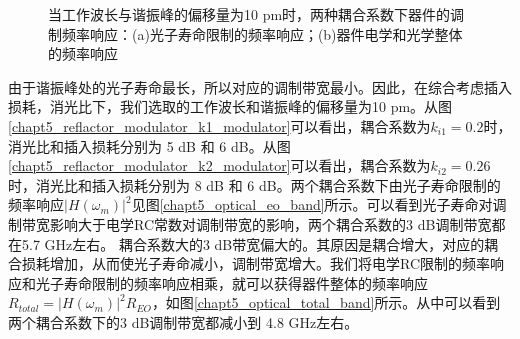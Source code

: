 \begin{figure}[htb]
	\small
	\caption{当工作波长与谐振峰的偏移量为10 pm时，两种耦合系数下器件的调制频率响应：(a)光子寿命限制的频率响应；(b)器件电学和光学整体的频率响应}
	\label{chapt5_optical_oe_total_band}	
\end{figure}
				
由于谐振峰处的光子寿命最长，所以对应的调制带宽最小。因此，在综合考虑插入损耗，消光比下，我们选取的工作波长和谐振峰的偏移量为10 pm。从图\ref{chapt5_reflactor_modulator_k1_modulator}可以看出，耦合系数为$k_{i1} = 0.2$时，消光比和插入损耗分别为 5 dB 和 6 dB。从图\ref{chapt5_reflactor_modulator_k2_modulator}可以看出，耦合系数为$k_{i2} = 0.26$时，消光比和插入损耗分别为 8 dB 和 6 dB。两个耦合系数下由光子寿命限制的频率响应$|H(\omega_m)|^2$见图\ref{chapt5_optical_eo_band}所示。可以看到光子寿命对调制带宽影响大于电学RC常数对调制带宽的影响，两个耦合系数的3 dB调制带宽都在5.7 GHz左右。 耦合系数大的3 dB带宽偏大的。其原因是耦合增大，对应的耦合损耗增加，从而使光子寿命减小，调制带宽增大。我们将电学RC限制的频率响应和光子寿命限制的频率响应相乘，就可以获得器件整体的频率响应$R_{total} = |H(\omega_m)|^2 R_{EO}$，如图\ref{chapt5_optical_total_band}所示。从中可以看到两个耦合系数下的3 dB调制带宽都减小到 4.8 GHz左右。

